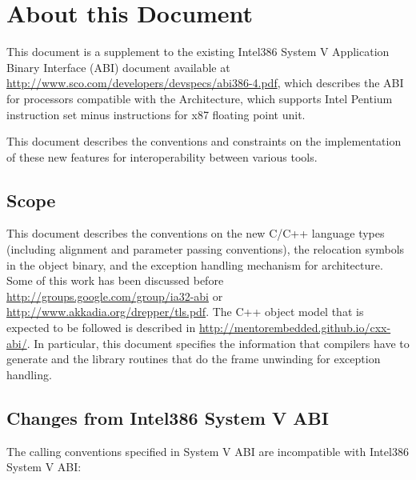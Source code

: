 \chapter{About this Document\label{intro}}

This document is a supplement to the existing Intel386 System V
Application Binary Interface (ABI) document available at
\url{http://www.sco.com/developers/devspecs/abi386-4.pdf},
which describes the ABI for processors compatible with the
\xARCH Architecture, which supports Intel Pentium instruction set
minus instructions for x87 floating point unit.

This document describes the conventions and constraints on the
implementation of these new features for interoperability between
various tools.

\section{Scope}

This document describes the conventions on the new C/C++ language types
(including alignment and parameter passing conventions), the relocation
symbols in the object binary, and the exception handling mechanism for
\xARCH architecture.  Some of this work has been discussed before
\url{http://groups.google.com/group/ia32-abi} or
\url{http://www.akkadia.org/drepper/tls.pdf}. The C++ object model that
is expected to be followed is described in
\url{http://mentorembedded.github.io/cxx-abi/}.  In particular,
this document specifies the information that compilers have to generate
and the library routines that do the frame unwinding for exception
handling.

\section{Changes from Intel386 System V ABI}

The calling conventions specified in \xARCH System V ABI are
incompatible with Intel386 System V ABI:

